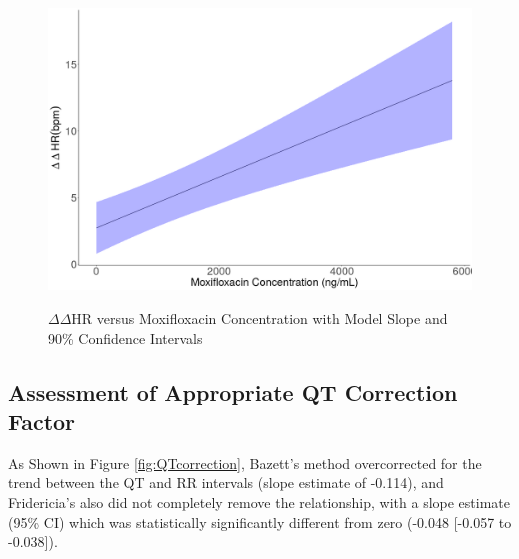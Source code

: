 \documentclass[
]{article}
\begin{document}
\begin{figure}[H]
\caption{$\Delta \Delta$HR versus Moxifloxacin Concentration with Model Slope and 90\% Confidence Intervals}
\includegraphics[width=\textwidth]{../Report/Figures/HRvsmoxi.png}
\label{fig:HRvsmoxi}
\end{figure}

\hypertarget{assessment-of-appropriate-qt-correction-factor}{%
\subsection{Assessment of Appropriate QT Correction
Factor}\label{assessment-of-appropriate-qt-correction-factor}}

As Shown in Figure \ref{fig:QTcorrection}, Bazett's method overcorrected
for the trend between the QT and RR intervals (slope estimate of
-0.114), and Fridericia's also did not completely remove the
relationship, with a slope estimate (95\% CI) which was statistically
significantly different from zero (-0.048 {[}-0.057 to -0.038{]}).

\clearpage
\end{document}
